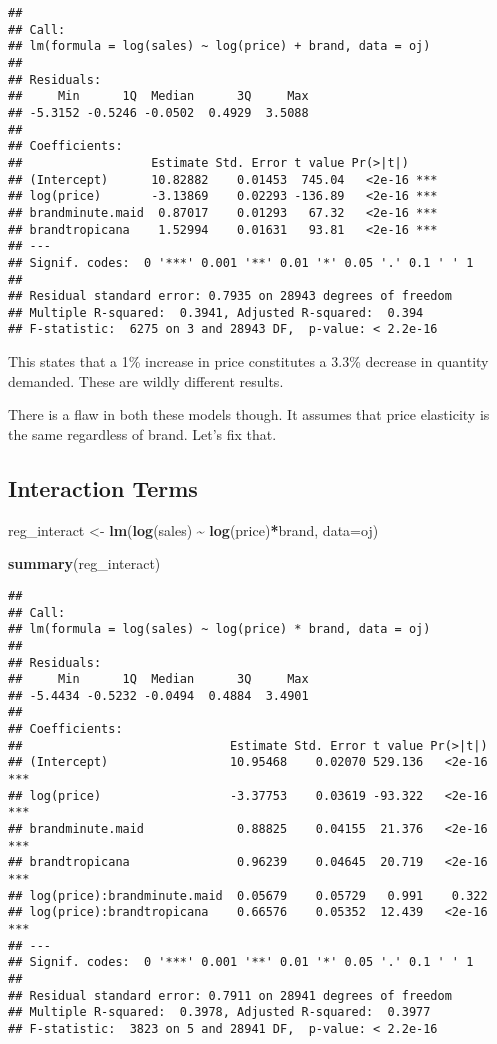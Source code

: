 \documentclass[
]{article}
\newenvironment{Shaded}{\begin{snugshade}}{\end{snugshade}}
\newcommand{\AttributeTok}[1]{\textcolor[rgb]{0.13,0.29,0.53}{#1}}
\newcommand{\FunctionTok}[1]{\textcolor[rgb]{0.13,0.29,0.53}{\textbf{#1}}}
\newcommand{\NormalTok}[1]{#1}
\newcommand{\OtherTok}[1]{\textcolor[rgb]{0.56,0.35,0.01}{#1}}
\newcommand{\SpecialCharTok}[1]{\textcolor[rgb]{0.81,0.36,0.00}{\textbf{#1}}}
\begin{document}
\begin{verbatim}
## 
## Call:
## lm(formula = log(sales) ~ log(price) + brand, data = oj)
## 
## Residuals:
##     Min      1Q  Median      3Q     Max 
## -5.3152 -0.5246 -0.0502  0.4929  3.5088 
## 
## Coefficients:
##                  Estimate Std. Error t value Pr(>|t|)    
## (Intercept)      10.82882    0.01453  745.04   <2e-16 ***
## log(price)       -3.13869    0.02293 -136.89   <2e-16 ***
## brandminute.maid  0.87017    0.01293   67.32   <2e-16 ***
## brandtropicana    1.52994    0.01631   93.81   <2e-16 ***
## ---
## Signif. codes:  0 '***' 0.001 '**' 0.01 '*' 0.05 '.' 0.1 ' ' 1
## 
## Residual standard error: 0.7935 on 28943 degrees of freedom
## Multiple R-squared:  0.3941, Adjusted R-squared:  0.394 
## F-statistic:  6275 on 3 and 28943 DF,  p-value: < 2.2e-16
\end{verbatim}

This states that a 1\% increase in price constitutes a 3.3\% decrease in
quantity demanded. These are wildly different results.

There is a flaw in both these models though. It assumes that price
elasticity is the same regardless of brand. Let's fix that.

\subsection{Interaction Terms}\label{interaction-terms}

\begin{Shaded}
\begin{Highlighting}[]
\NormalTok{reg\_interact }\OtherTok{\textless{}{-}}  \FunctionTok{lm}\NormalTok{(}\FunctionTok{log}\NormalTok{(sales) }\SpecialCharTok{\textasciitilde{}} \FunctionTok{log}\NormalTok{(price)}\SpecialCharTok{*}\NormalTok{brand, }\AttributeTok{data=}\NormalTok{oj)}

\FunctionTok{summary}\NormalTok{(reg\_interact)}
\end{Highlighting}
\end{Shaded}

\begin{verbatim}
## 
## Call:
## lm(formula = log(sales) ~ log(price) * brand, data = oj)
## 
## Residuals:
##     Min      1Q  Median      3Q     Max 
## -5.4434 -0.5232 -0.0494  0.4884  3.4901 
## 
## Coefficients:
##                             Estimate Std. Error t value Pr(>|t|)    
## (Intercept)                 10.95468    0.02070 529.136   <2e-16 ***
## log(price)                  -3.37753    0.03619 -93.322   <2e-16 ***
## brandminute.maid             0.88825    0.04155  21.376   <2e-16 ***
## brandtropicana               0.96239    0.04645  20.719   <2e-16 ***
## log(price):brandminute.maid  0.05679    0.05729   0.991    0.322    
## log(price):brandtropicana    0.66576    0.05352  12.439   <2e-16 ***
## ---
## Signif. codes:  0 '***' 0.001 '**' 0.01 '*' 0.05 '.' 0.1 ' ' 1
## 
## Residual standard error: 0.7911 on 28941 degrees of freedom
## Multiple R-squared:  0.3978, Adjusted R-squared:  0.3977 
## F-statistic:  3823 on 5 and 28941 DF,  p-value: < 2.2e-16
\end{verbatim}
\end{document}
